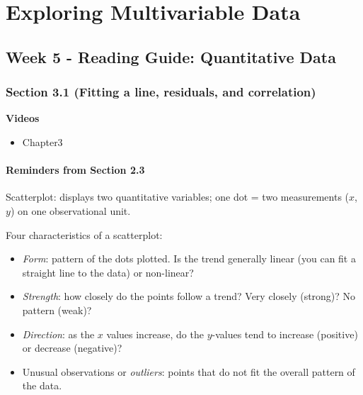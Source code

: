 \documentclass[
]{report}
\providecommand{\tightlist}{%
  \setlength{\itemsep}{0pt}\setlength{\parskip}{0pt}}
\begin{document}
\vspace{0.5in}

\newpage

\hypertarget{exploring-multivariable-data}{%
\chapter{Exploring Multivariable Data}\label{exploring-multivariable-data}}

\hypertarget{week-5---reading-guide-quantitative-data}{%
\section{Week 5 - Reading Guide: Quantitative Data}\label{week-5---reading-guide-quantitative-data}}

\hypertarget{section-3.1-fitting-a-line-residuals-and-correlation}{%
\subsection*{Section 3.1 (Fitting a line, residuals, and correlation)}\label{section-3.1-fitting-a-line-residuals-and-correlation}}


\textbf{Videos}

\begin{itemize}
\tightlist
\item
  Chapter3
\end{itemize}


\hypertarget{reminders-from-section-2.3}{%
\subsubsection*{Reminders from Section 2.3}\label{reminders-from-section-2.3}}

Scatterplot: displays two quantitative variables; one dot = two measurements (\(x\), \(y\)) on one observational unit.

Four characteristics of a scatterplot:

\begin{itemize}
\tightlist
\item
  \emph{Form}: pattern of the dots plotted. Is the trend generally linear (you can fit a straight line to the data) or non-linear?\\
\item
  \emph{Strength}: how closely do the points follow a trend? Very closely (strong)? No pattern (weak)?\\
\item
  \emph{Direction}: as the \(x\) values increase, do the \(y\)-values tend to increase (positive) or decrease (negative)?\\
\item
  Unusual observations or \emph{outliers}: points that do not fit the overall pattern of the data.
\end{itemize}
\end{document}
